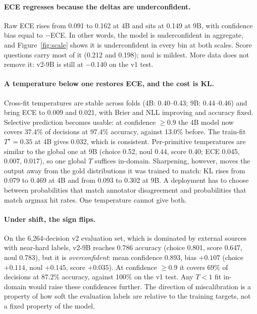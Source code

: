 \documentclass{article}
\begin{document}
\paragraph{ECE regresses because the deltas are underconfident.} Raw ECE
rises from 0.091 to 0.162 at 4B and sits at 0.149 at 9B, with confidence
bias equal to $-$ECE. In other words, the model is underconfident in
aggregate, and Figure~\ref{fig:scale} shows it is underconfident in every
bin at both scales. Score questions carry most of it (0.212 and 0.198);
noul is mildest. More data does not remove it: v2-9B is still at $-0.140$
on the v1 test.

\paragraph{A temperature below one restores ECE, and the cost is KL.}
Cross-fit temperatures are stable across folds (4B: 0.40--0.43; 9B:
0.44--0.46) and bring ECE to 0.009 and 0.021, with Brier and NLL improving
and accuracy fixed. Selective prediction becomes usable: at confidence
$\ge0.9$ the 4B model now covers 37.4\% of decisions at 97.4\% accuracy,
against 13.0\% before. The train-fit $T^\star=0.35$ at 4B gives 0.032, which
is consistent. Per-primitive temperatures are similar to the global one at
9B (choice 0.52, noul 0.44, score 0.40; ECE 0.045, 0.007, 0.017), so one
global $T$ suffices in-domain. Sharpening, however, moves the output away
from the gold distributions it was trained to match: KL rises from 0.079
to 0.469 at 4B and from 0.093 to 0.302 at 9B. A deployment has to choose
between probabilities that match annotator disagreement and probabilities
that match argmax hit rates. One temperature cannot give both.

\paragraph{Under shift, the sign flips.} On the 6,264-decision v2
evaluation set, which is dominated by external sources with near-hard
labels, v2-9B reaches 0.786 accuracy (choice 0.801, score 0.647, noul
0.783), but it is \emph{overconfident}: mean confidence 0.893, bias
$+0.107$ (choice $+0.114$, noul $+0.145$, score $+0.035$). At confidence
$\ge0.9$ it covers 69\% of decisions at 87.2\% accuracy, against 100\% on
the v1 test. Any $T<1$ fit in-domain would raise these confidences further.
The direction of miscalibration is a property of how soft the evaluation
labels are relative to the training targets, not a fixed property of the
model.
\end{document}
